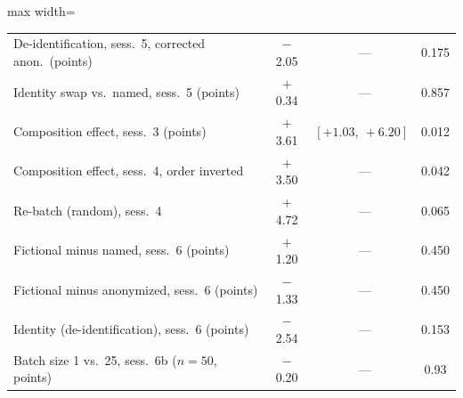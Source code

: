 \begin{table}[htbp]
\begin{threeparttable}
\begin{adjustbox}{max width=\textwidth}
\begin{tabular}{lccc}
De-identification, sess.\ 5, corrected anon.\ (points) & $-$2.05 &~--- & 0.175 \\
Identity swap vs.\ named, sess.\ 5 (points) & $+$0.34 &~--- & 0.857 \\
Composition effect, sess.\ 3 (points) & $+$3.61 & $[+1.03,\ +6.20]$ & 0.012 \\
Composition effect, sess.\ 4, order inverted & $+$3.50 &~--- & 0.042 \\
Re-batch (random), sess.\ 4 & $+$4.72 &~--- & 0.065 \\
Fictional minus named, sess.\ 6 (points) & $+$1.20 &~--- & 0.450 \\
Fictional minus anonymized, sess.\ 6 (points) & $-$1.33 &~--- & 0.450 \\
Identity (de-identification), sess.\ 6 (points) & $-$2.54 &~--- & 0.153 \\
Batch size 1 vs.\ 25, sess.\ 6b ($n=50$, points) & $-$0.20 &~--- & 0.93 \\
\bottomrule
\end{tabular}
\end{adjustbox}
\begin{tablenotes}[flushleft]\footnotesize

\end{tablenotes}
\end{threeparttable}
\end{table}
